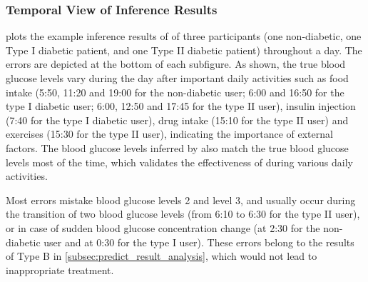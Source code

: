 \subsubsection{Temporal View of Inference Results}
 plots the example inference results of \sysname of three participants (one non-diabetic, one Type I diabetic patient, and one Type II diabetic patient) throughout a day.
The errors are depicted at the bottom of each subfigure.
As shown, the true blood glucose levels vary during the day after important daily activities such as food intake (5:50, 11:20 and 19:00 for the non-diabetic user; 6:00 and 16:50 for the type I diabetic user; 6:00, 12:50 and 17:45 for the type II user), insulin injection (7:40 for the type I diabetic user), drug intake (15:10 for the type II user) and exercises (15:30 for the type II user), indicating the importance of external factors.
The blood glucose levels inferred by \sysname also match the true blood glucose levels most of the time, which validates the effectiveness of \sysname during various daily activities.

\textcolor[rgb]{1.00,0.00,0.00}{Most errors mistake blood glucose levels 2 and level 3, and usually occur during the transition of two blood glucose levels (\eg from 6:10 to 6:30 for the type II user), or in case of sudden blood glucose concentration change (\eg at 2:30 for the non-diabetic user and at 0:30 for the type I user).
These errors  belong to the results of Type B in \ref{subsec:predict_result_analysis}, which would not lead to inappropriate treatment.}




